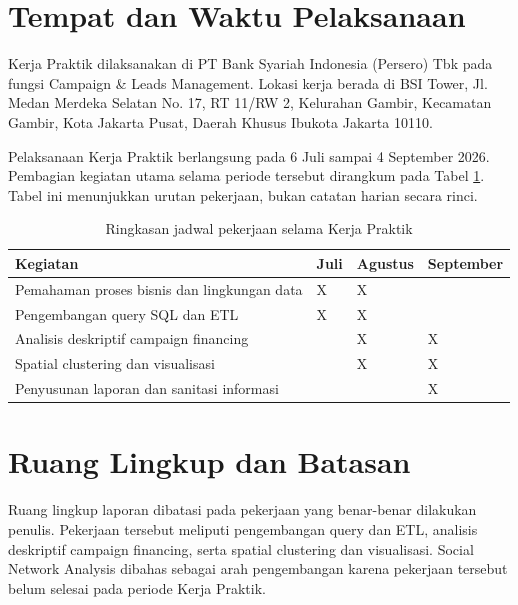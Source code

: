\section{Tempat dan Waktu Pelaksanaan}
Kerja Praktik dilaksanakan di PT Bank Syariah Indonesia (Persero) Tbk pada fungsi Campaign \& Leads Management. Lokasi kerja berada di BSI Tower, Jl. Medan Merdeka Selatan No. 17, RT 11/RW 2, Kelurahan Gambir, Kecamatan Gambir, Kota Jakarta Pusat, Daerah Khusus Ibukota Jakarta 10110.

Pelaksanaan Kerja Praktik berlangsung pada 6 Juli sampai 4 September 2026. Pembagian kegiatan utama selama periode tersebut dirangkum pada Tabel \ref{tab:jadwal-kp}. Tabel ini menunjukkan urutan pekerjaan, bukan catatan harian secara rinci.

\begin{table}[htbp]
\caption{Ringkasan jadwal pekerjaan selama Kerja Praktik}
\label{tab:jadwal-kp}
\centering
\small
\setlength{\tabcolsep}{6pt}
\renewcommand{\arraystretch}{1.30}
\begin{tabularx}{0.92\textwidth}{@{}
>{\raggedright\arraybackslash}X
>{\centering\arraybackslash}p{1.35cm}
>{\centering\arraybackslash}p{1.65cm}
>{\centering\arraybackslash}p{1.85cm}
@{}}
\toprule
\textbf{Kegiatan} & \textbf{Juli} & \textbf{Agustus} & \textbf{September} \\
\midrule
Pemahaman proses bisnis dan lingkungan data & X & X & \\
\addlinespace[2pt]
Pengembangan query SQL dan ETL & X & X & \\
\addlinespace[2pt]
Analisis deskriptif campaign financing & & X & X \\
\addlinespace[2pt]
Spatial clustering dan visualisasi & & X & X \\
\addlinespace[2pt]
Penyusunan laporan dan sanitasi informasi & & & X \\
\bottomrule
\end{tabularx}
\end{table}

\section{Ruang Lingkup dan Batasan}
Ruang lingkup laporan dibatasi pada pekerjaan yang benar-benar dilakukan penulis. Pekerjaan tersebut meliputi pengembangan query dan ETL, analisis deskriptif campaign financing, serta spatial clustering dan visualisasi. Social Network Analysis dibahas sebagai arah pengembangan karena pekerjaan tersebut belum selesai pada periode Kerja Praktik.


